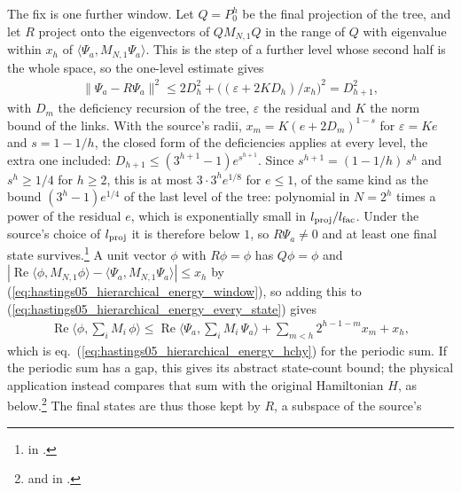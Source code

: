\documentclass{article}
\begin{document}
The fix is one further window. Let $Q=P^h_0$ be the final projection of the
tree, and let $R$ project onto the eigenvectors of $QM_{N,1}Q$ in the range of
$Q$ with eigenvalue within $x_h$ of $\langle\Psi_a,M_{N,1}\Psi_a\rangle$. This
is the step of a further level whose second half is the whole space, so the
one-level estimate gives
\begin{align}
 \|\Psi_a-R\Psi_a\|^2\le2D_h^2+\bigl((\varepsilon+2KD_h)/x_h\bigr)^2=D_{h+1}^2,
 \label{eq:hastings05_hierarchical_energy_closing_deficiency}
\end{align}
with $D_m$ the deficiency recursion of the tree, $\varepsilon$ the residual
and $K$ the norm bound of the links. With the source's radii,
$x_m=K(e+2D_m)^{1-s}$ for $\varepsilon=Ke$ and $s=1-1/h$, the closed form of the
deficiencies applies at every level, the extra one included:
$D_{h+1}\le(3^{h+1}-1)e^{s^{h+1}}$. Since $s^{h+1}=(1-1/h)\,s^h$ and
$s^h\ge1/4$ for $h\ge2$, this is at most $3\cdot3^h e^{1/8}$ for $e\le1$, of the
same kind as the bound $(3^h-1)e^{1/4}$ of the last level of the tree: polynomial in
$N=2^h$ times a power of the residual $e$, which is exponentially small in
$l_{\rm proj}/l_{\rm fac}$. Under the source's choice of $l_{\rm proj}$ it is
therefore below $1$, so $R\Psi_a\ne0$ and at least one final state
survives.\footnote{
    in .}
A unit vector $\phi$ with $R\phi=\phi$ has $Q\phi=\phi$ and
$|\operatorname{Re}\langle\phi,M_{N,1}\phi\rangle-\langle\Psi_a,M_{N,1}\Psi_a\rangle|\le x_h$
by (\ref{eq:hastings05_hierarchical_energy_window}), so adding this to
(\ref{eq:hastings05_hierarchical_energy_every_state}) gives
\begin{align}
 \operatorname{Re}\langle\phi,\textstyle\sum_iM_i\,\phi\rangle
 \le\operatorname{Re}\langle\Psi_a,\textstyle\sum_iM_i\,\Psi_a\rangle
 +\sum_{m<h}2^{h-1-m}x_m+x_h,
 \label{eq:hastings05_hierarchical_energy_periodic}
\end{align}
which is eq.~(\ref{eq:hastings05_hierarchical_energy_hchy}) for the periodic
sum. If the periodic sum has a gap, this gives its abstract state-count
bound; the physical application instead compares that sum with the original
Hamiltonian $H$, as below.\footnote{
    and
    in .}
The final states are thus those kept by $R$, a subspace of the source's
\end{document}
